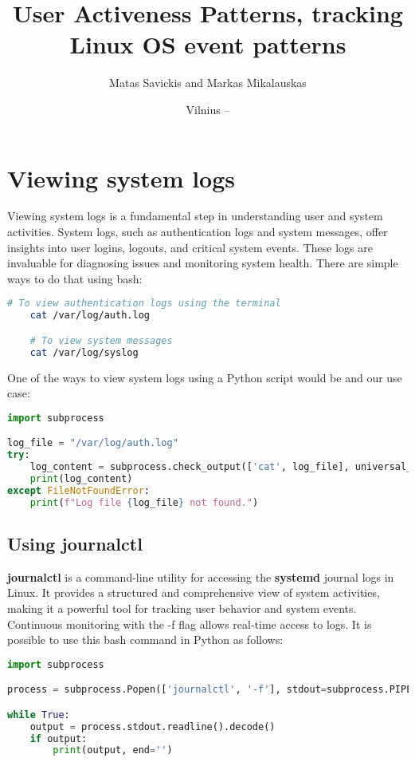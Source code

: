 \documentclass{VUMIFPSmagistrinis}
\title{User Activeness Patterns, tracking Linux OS event patterns}
\author{Matas Savickis and Markas Mikalauskas}
\date{Vilnius – \the\year}
\begin{document}

\maketitle

\tableofcontents





\section{Viewing system logs}
Viewing system logs is a fundamental step in understanding user and system activities. System logs, such as authentication logs and system messages, offer insights into user logins, logouts, and critical system events. These logs are invaluable for diagnosing issues and monitoring system health. There are simple ways to do that using bash:

\begin{lstlisting}[language=bash]
    # To view authentication logs using the terminal
    cat /var/log/auth.log 

    # To view system messages
    cat /var/log/syslog
\end{lstlisting}

\noindent One of the ways to view system logs using a Python script would be and our use case:
\begin{lstlisting}[language=Python]
import subprocess

log_file = "/var/log/auth.log"
try:
    log_content = subprocess.check_output(['cat', log_file], universal_newlines=True)
    print(log_content)
except FileNotFoundError:
    print(f"Log file {log_file} not found.")
\end{lstlisting}

\subsection{Using journalctl}
\textbf{journalctl} is a command-line utility for accessing the \textbf{systemd} journal logs in Linux. It provides a structured and comprehensive view of system activities, making it a powerful tool for tracking user behavior and system events. Continuous monitoring with the -f flag allows real-time access to logs. It is possible to use this bash command in Python as follows:

\begin{lstlisting}[language=Python]
import subprocess

process = subprocess.Popen(['journalctl', '-f'], stdout=subprocess.PIPE, stderr=subprocess.PIPE)

while True:
    output = process.stdout.readline().decode()
    if output:
        print(output, end='')
\end{lstlisting}
\end{document}
